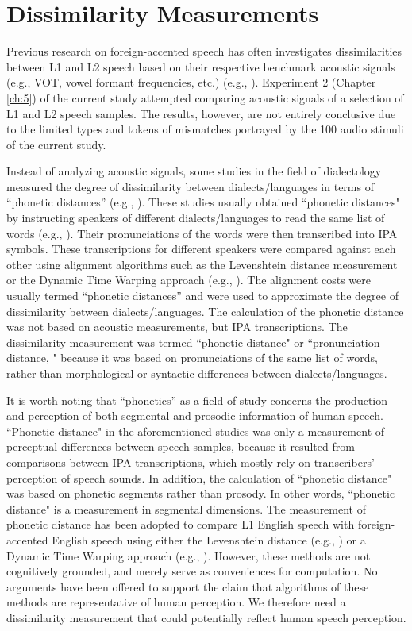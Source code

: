 \section{Dissimilarity Measurements}

Previous research on foreign-accented speech has often investigates dissimilarities between L1 and L2 speech based on their respective benchmark acoustic signals (e.g., VOT, vowel formant frequencies, etc.) (e.g., \citealp{McCullough_2013}). Experiment 2 (Chapter \ref{ch:5}) of the current study attempted comparing acoustic signals of a selection of L1 and L2 speech samples. The results, however, are not entirely conclusive due to the limited types and tokens of mismatches portrayed by the 100 audio stimuli of the current study. 

Instead of analyzing acoustic signals, some studies in the field of dialectology measured the degree of dissimilarity between dialects/languages in terms of  “phonetic distances” (e.g., \citealp{Nerbonne_1996}). These studies usually obtained ``phonetic distances" by instructing speakers of different dialects/languages to read the same list of words (e.g., \citealp{Nerbonne_1996}). Their pronunciations of the words were then transcribed into IPA symbols. These transcriptions for different speakers were compared against each other using alignment algorithms such as the Levenshtein distance measurement \citep{Nerbonne_1996, Wieling_2014b} or the Dynamic Time Warping approach (e.g., \citealp{Johnson_2004}). The alignment costs were usually termed ``phonetic distances” and were used to approximate the degree of dissimilarity between dialects/languages. The calculation of the phonetic distance was not based on acoustic measurements, but IPA transcriptions. The dissimilarity measurement was termed ``phonetic distance" or ``pronunciation distance, " because it was based on pronunciations of the same list of words, rather than morphological or syntactic differences between dialects/languages. 

It is worth noting that “phonetics” as a field of study concerns the production and perception of  both segmental and prosodic information of human speech. ``Phonetic distance" in the aforementioned studies was only a measurement of perceptual differences between speech samples, because it resulted from comparisons between IPA transcriptions, which mostly rely on transcribers’ perception of speech sounds. In addition, the calculation of ``phonetic distance" was based on phonetic segments rather than prosody.  In other words, ``phonetic distance" is a measurement in segmental dimensions. The measurement of phonetic distance has been adopted to compare L1 English speech with foreign-accented English speech using either the Levenshtein distance (e.g., \citealp{Wieling_2014b, schaden_2006}) or a Dynamic Time Warping approach (e.g., \citealp{shen_2013}). However, these methods are not cognitively grounded, and merely serve as conveniences for computation. No arguments have been offered to support the claim that algorithms of these methods are representative of human perception. We therefore need a dissimilarity measurement that could potentially reflect human speech perception.

